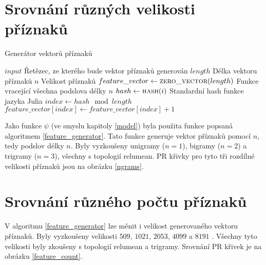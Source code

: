 
\section{Srovnání různých velikosti příznaků}

\begin{algorithm}
	\caption{Generátor vektorů příznaků}
	\label{feature_generator}
	\begin{algorithmic}
		\Require $ input $ \Comment Řetězec, ze kterého bude vektor příznaků generován
		\Require $ length $ \Comment Délka vektoru příznaků
		\Require $ n $ \Comment Velikost příznaků
		\Statex
		\State $ feature\_vector \gets \Call{zero\_vector}{length} $
		 \Comment Funkce vracející všechna podslova délky $ n $
			\State $ hash \gets \Call{hash}{i} $ \Comment Standardní hash funkce jazyka Julia
			\State $ index \gets hash \mod length $
			\State $ feature\_vector \left[ index \right] \gets feature\_vector \left[ index \right] + 1 $
		\EndFor
	\end{algorithmic}
\end{algorithm}

Jako funkce \( \psi \) (ve smyslu kapitoly \ref{model}) byla použita funkce popsaná algoritmem \ref{feature_generator}. Tato funkce generuje vektor příznaků pomocí \( n \), tedy podslov délky \( n \). Byly vyzkoušeny unigramy (\( n = 1 \)), bigramy  (\( n = 2 \)) a trigramy (\( n = 3 \)), všechny s topologií relumean. PR křivky pro tyto tři rozdílné velikosti příznaků jsou na obrázku \ref{ngrams}.


\section{Srovnání různého počtu příznaků}
V algoritmu \ref{feature_generator} lze měnit i velikost generovaného vektoru příznaků. Byly vyzkoušeny velikosti \( 509 \), \( 1021 \), \( 2053 \), \( 4099 \) a \( 8191 \) . Všechny tyto velikosti byly zkoušeny s topologií relumean a trigramy. Srovnání PR křivek je na obrázku \ref{feature_count}.


